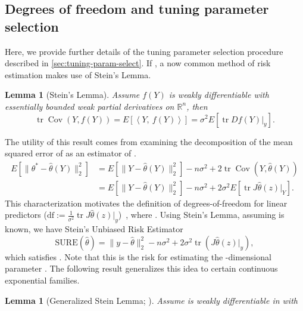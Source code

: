 \documentclass[ejs,noshowframe]{imsart}
\theoremstyle{plain}
\newtheorem{lemma}[theorem]{Lemma}
\theoremstyle{definition}
\newcommand{\snorm}[1]{\lVert #1 \rVert}
\newcommand{\R}{\mathbb{R}}
\newcommand{\E}{E}
\newcommand{\Expect}[1]{\E\left[#1\right]}
\renewcommand{\hat}{\widehat}
\DeclareMathOperator*{\trace}{tr}
\DeclareMathOperator*{\Cov}{Cov}
\begin{document}
\begin{appendix}
\section{Degrees of freedom and tuning parameter selection}
\label{sec:app-comp-deets}

Here, we provide further details of the tuning parameter selection procedure
described in \autoref{sec:tuning-param-select}. 
If , a now common method of risk
estimation makes use of Stein's Lemma.
\begin{lemma}[Stein's Lemma]
	  Assume $f(Y)$ is weakly differentiable with essentially
	  bounded weak partial derivatives on $\R^n$, then
	  \begin{equation}
		    \label{eq:8}
		    \trace \Cov(Y,f(Y)) = \Expect{\left\langle Y,\ f(Y)\right\rangle} = 
		\sigma^2\Expect{\trace Df(Y) \bigg\vert_y }.
		  \end{equation}
	\end{lemma}
The utility of this result comes from examining the decomposition of
the mean squared error of \smash{$\hat\theta(Y)$} as an estimator of 
\smash{$\theta^*$}.
\begin{align}
	\Expect{\snorm{\theta^*-\hat\theta(Y)}_2^2}
	&= \Expect{\snorm{Y-\hat\theta(Y)}_2^2} -n\sigma^2 + 2
	\trace\Cov(Y,\hat\theta(Y))\\
	&= \Expect{\snorm{Y-\hat\theta(Y)}_2^2} -n\sigma^2 + 2\sigma^2
	\Expect{\trace J\hat\theta(z) \big\vert_Y} .
\end{align}
This characterization motivates the definition of degrees-of-freedom
for linear predictors ($\textrm{df} :=\frac{1}{\sigma^2} \trace
J\hat\theta(z)\big\vert_y$)~\citep{Efron1986}, where 
\smash{$\hat\theta(y)=Hy$}. Using
Stein's Lemma, assuming  is known, we have Stein's Unbiased
Risk Estimator
\begin{equation}
	\mathrm{SURE}(\hat\theta) = \snorm{y-\hat\theta}_2^2 -n\sigma^2 + 
	2\sigma^2\trace\left( J\hat\theta(z) \big\vert_y\right), 
\end{equation}
which satisfies \smash{$E[\textrm{SURE}(\hat\theta)] =
E\snorm{\theta^* - \hat\theta(Y)}_2^2$}. 
Note that this is the risk for estimating the -dimensional parameter
\smash{$\theta^*$}.  
The following result generalizes this idea to certain continuous
exponential families.
\begin{lemma}[Generalized Stein Lemma; \citealp{Eldar2009}]
	\label{lem:g-stein-lemma}
	Assume \smash{$\hat\theta(y)$} is weakly differentiable in  with 

\end{lemma}
\end{appendix}
\end{document}
